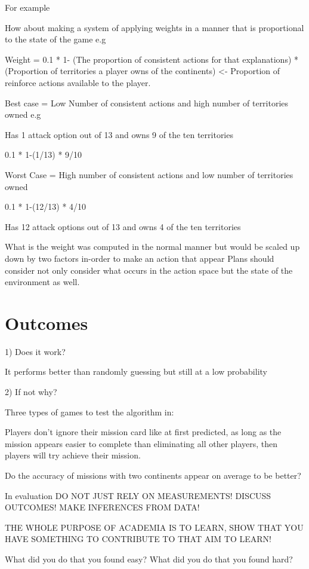 \documentclass[parskip]{cs4rep}
\begin{document}
For example

How about making a system of applying weights in a manner that is proportional to the state of the game e.g

Weight = 0.1 * 1- (The proportion of consistent actions for that explanations) * (Proportion of territories a player owns of the continents) <- Proportion of reinforce actions available to the player.

Best case = Low Number of consistent actions and high number of territories owned e.g

Has 1 attack option out of 13 and owns 9 of the ten territories

0.1 * 1-(1/13) * 9/10 

Worst Case = High number of consistent actions and low number of territories owned

0.1 * 1-(12/13) * 4/10 

Has 12 attack options out of 13 and owns 4 of the ten territories

What is the weight was computed in the normal manner but would be scaled up down by two factors in-order to make an action that appear
Plans should consider not only consider what occurs in the action space but the state of the environment as well.

\section{Outcomes}

1) Does it work?

It performs better than randomly guessing but still at a low probability

2) If not why?

Three types of games to test the algorithm in:

Players don't ignore their mission card like at first predicted, as long as the mission appears easier to complete than eliminating all other players, then players will try achieve their mission.

Do the accuracy of missions with two continents appear on average to be better?

In evaluation DO NOT JUST RELY ON MEASUREMENTS! DISCUSS OUTCOMES! MAKE INFERENCES FROM DATA!

THE WHOLE PURPOSE OF ACADEMIA IS TO LEARN, SHOW THAT YOU HAVE SOMETHING TO CONTRIBUTE TO THAT AIM TO LEARN!

What did you do that you found easy? What did you do that you found hard? 
\end{document}

